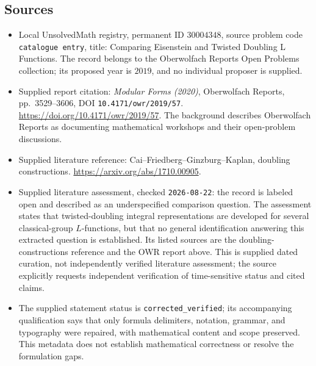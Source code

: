 \documentclass[11pt]{article}
\begin{document}
\subsection{Sources}
\begin{itemize}
\item Local UnsolvedMath registry, permanent ID \(30004348\), source problem code \texttt{catalogue entry}, title: Comparing Eisenstein and Twisted Doubling L Functions. The record belongs to the Oberwolfach Reports Open Problems collection; its proposed year is \(2019\), and no individual proposer is supplied.
\item Supplied report citation: \emph{Modular Forms (2020)}, Oberwolfach Reports, pp.\ 3529--3606, DOI \texttt{10.4171/owr/2019/57}. \url{https://doi.org/10.4171/owr/2019/57}. The background describes Oberwolfach Reports as documenting mathematical workshops and their open-problem discussions.
\item Supplied literature reference: Cai--Friedberg--Ginzburg--Kaplan, doubling constructions. \url{https://arxiv.org/abs/1710.00905}.
\item Supplied literature assessment, checked \texttt{2026-08-22}: the record is labeled open and described as an underspecified comparison question. The assessment states that twisted-doubling integral representations are developed for several classical-group \(L\)-functions, but that no general identification answering this extracted question is established. Its listed sources are the doubling-constructions reference and the OWR report above. This is supplied dated curation, not independently verified literature assessment; the source explicitly requests independent verification of time-sensitive status and cited claims.
\item The supplied statement status is \texttt{corrected\_verified}; its accompanying qualification says that only formula delimiters, notation, grammar, and typography were repaired, with mathematical content and scope preserved. This metadata does not establish mathematical correctness or resolve the formulation gaps.
\end{itemize}
\end{document}
